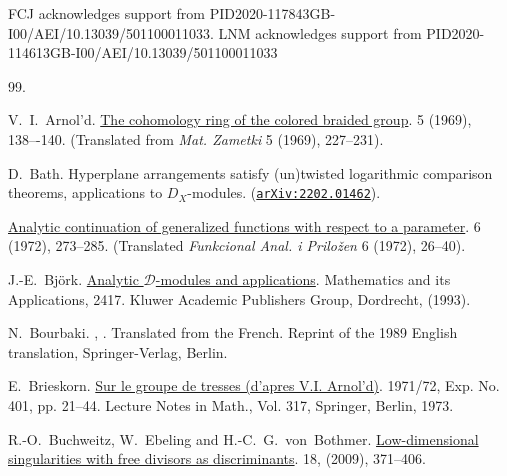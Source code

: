 \documentclass[12pt]{article}
\newcommand{\DD}{\mathcal{D}}
\begin{document}
FCJ acknowledges support from PID2020-117843GB-I00/AEI/10.13039/501100011033. LNM  acknowledges support from PID2020-114613GB-I00/AEI/10.13039/501100011033


\begin{thebibliography}{99.}

 V.~I.~Arnol'd.
\newblock \href{https://doi.org/10.1007/BF01098313}{The cohomology ring of the colored braided group}.
 5 (1969), 138–-140.
\newblock (Translated from {\em Mat. Zametki} 5 (1969), 227--231).



 D.~Bath.
\newblock Hyperplane arrangements satisfy (un)twisted logarithmic comparison theorems, applications to {$D_X$}-modules.
\newblock (\href{https://doi.org/10.48550/arXiv.2202.01462}{\tt arXiv:2202.01462}).

\newblock \href{https://doi.org/10.1007/BF01077645
}{Analytic continuation of generalized functions with respect to
              a parameter}.
 6 (1972), 273--285.
\newblock (Translated {\em Funkcional Anal. i Prilo\v{z}en} 6 (1972), {26--40}).


J.-E.~Bj\"{o}rk.
\newblock \href{https://doi.org/10.1007/978-94-017-0717-6}{Analytic $\DD$-modules and applications}.
\newblock Mathematics and its Applications, 2417.
Kluwer Academic Publishers Group, Dordrecht, (1993).

N.~Bourbaki.
,
. {Translated from the French. Reprint of the 1989 English translation}, {Springer-Verlag, Berlin}.

 E.~Brieskorn.
\newblock \href{https://rd.springer.com/chapter/10.1007/BFb0069274}{Sur le groupe de tresses (d'apres V.I. Arnol'd)}.
 1971/72, Exp. No. 401, pp. 21--44.
Lecture Notes in Math., Vol. 317, Springer, Berlin, 1973.

 R.-O.~Buchweitz, W.~Ebeling and H.-C.~G.~von~Bothmer.
\newblock
\href{https://doi.org/10.1090/S1056-3911-08-00508-0}{Low-dimensional singularities with free divisors as discriminants}.
 18, (2009), 371--406.


\end{thebibliography}
\end{document}
